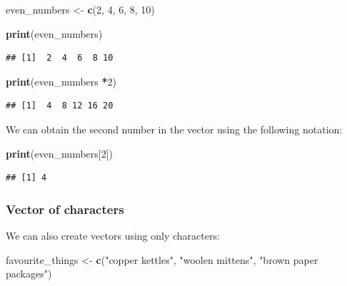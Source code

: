 \documentclass[
]{krantz}
\makeatletter
\newenvironment{Shaded}{\begin{snugshade}}{\end{snugshade}}
\newcommand{\DecValTok}[1]{\textcolor[rgb]{0.06,0.06,0.06}{#1}}
\newcommand{\KeywordTok}[1]{\textcolor[rgb]{0.27,0.27,0.27}{\textbf{#1}}}
\newcommand{\NormalTok}[1]{#1}
\newcommand{\OperatorTok}[1]{\textcolor[rgb]{0.43,0.43,0.43}{\textbf{#1}}}
\newcommand{\StringTok}[1]{\textcolor[rgb]{0.5,0.5,0.5}{#1}}
\newenvironment{kframe}{%
\medskip{}
\setlength{\fboxsep}{.8em}
 \def\at@end@of@kframe{}%
 \ifinner\ifhmode%
  \def\at@end@of@kframe{\end{minipage}}%
  \begin{minipage}{\columnwidth}%
 \fi\fi%
 \def\FrameCommand##1{\hskip\@totalleftmargin \hskip-\fboxsep
 \colorbox{shadecolor}{##1}\hskip-\fboxsep
     \hskip-\linewidth \hskip-\@totalleftmargin \hskip\columnwidth}%
 \MakeFramed {\advance\hsize-\width
   \@totalleftmargin\z@ \linewidth\hsize
   \@setminipage}}%
 {\par\unskip\endMakeFramed%
 \at@end@of@kframe}
\renewenvironment{Shaded}{\begin{kframe}}{\end{kframe}}
\makeatother
\begin{document}
\begin{Shaded}
\begin{Highlighting}[]
\NormalTok{even_numbers <-}\StringTok{ }\KeywordTok{c}\NormalTok{(}\DecValTok{2}\NormalTok{, }\DecValTok{4}\NormalTok{, }\DecValTok{6}\NormalTok{, }\DecValTok{8}\NormalTok{, }\DecValTok{10}\NormalTok{)}
\end{Highlighting}
\end{Shaded}

\begin{Shaded}
\begin{Highlighting}[]
\KeywordTok{print}\NormalTok{(even_numbers)}
\end{Highlighting}
\end{Shaded}

\begin{verbatim}
## [1]  2  4  6  8 10
\end{verbatim}

\begin{Shaded}
\begin{Highlighting}[]
\KeywordTok{print}\NormalTok{(even_numbers }\OperatorTok{*}\DecValTok{2}\NormalTok{)}
\end{Highlighting}
\end{Shaded}

\begin{verbatim}
## [1]  4  8 12 16 20
\end{verbatim}

We can obtain the second number in the vector using the following notation:

\begin{Shaded}
\begin{Highlighting}[]
\KeywordTok{print}\NormalTok{(even_numbers[}\DecValTok{2}\NormalTok{])}
\end{Highlighting}
\end{Shaded}

\begin{verbatim}
## [1] 4
\end{verbatim}

\hypertarget{vector-of-characters}{%
\subsubsection{Vector of characters}\label{vector-of-characters}}

We can also create vectors using only characters:

\begin{Shaded}
\begin{Highlighting}[]
\NormalTok{favourite_things <-}\StringTok{ }\KeywordTok{c}\NormalTok{(}\StringTok{"copper kettles"}\NormalTok{, }\StringTok{"woolen mittens"}\NormalTok{, }\StringTok{"brown paper packages"}\NormalTok{)}
\end{Highlighting}
\end{Shaded}
\end{document}
